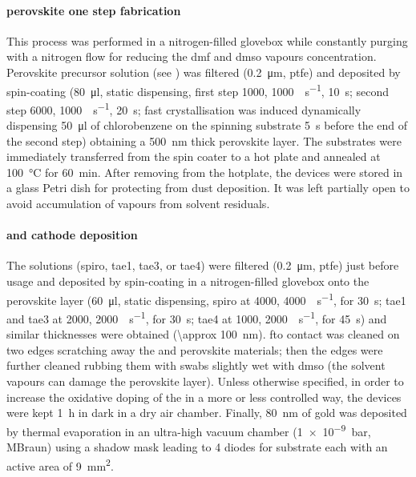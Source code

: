 
		\paragraph{ perovskite one step fabrication}

		This process was performed in a nitrogen-filled glovebox
		while constantly purging with a nitrogen flow for reducing the \gls{dmf} and \gls{dmso} vapours concentration.
		Perovskite precursor solution (see ) was filtered (\SI{0.2}{\um}, \gls{ptfe})
		and deposited by spin-coating (\SI{80}{\ul}, static dispensing, first step \SI{1000}{\rpm}, \SI{1000}{\rpm\per\s}, \SI{10}{\s};
		second step \SI{6000}{\rpm}, \SI{1000}{\rpm\per\s}, \SI{20}{\s}; fast crystallisation was induced dynamically
		dispensing \SI{50}{\ul} of chlorobenzene on the spinning substrate \SI{5}{\s} before the end of the second
		step) obtaining a \SI{500}{\nm} thick perovskite layer.
		The substrates were immediately transferred from
		the spin coater to a hot plate and annealed at \SI{100}{\celsius} for \SI{60}{\minute}.
		After removing from the hotplate, the devices were stored in a glass Petri dish for protecting from dust deposition.
		It was left partially open to avoid accumulation of vapours from solvent residuals.

		\paragraph{ and cathode deposition}
		The  solutions (\gls{spiro}, \gls{tae1}, \gls{tae3}, or \gls{tae4}) were filtered (\SI{0.2}{\um}, \gls{ptfe}) just before usage and deposited by spin-coating in a nitrogen-filled glovebox
		onto the perovskite layer (\SI{60}{\ul}, static dispensing, \gls{spiro} at \SI{4000}{\rpm}, \SI{4000}{\rpm\per\s},
		for \SI{30}{\s}; \gls{tae1} and \gls{tae3} at \SI{2000}{\rpm}, \SI{2000}{\rpm\per\s}, for \SI{30}{\s}; \gls{tae4} at \SI{1000}{\rpm}, \SI{2000}{\rpm\per\s},
		for \SI{45}{\s}) and similar  thicknesses were obtained (\SI{\approx 100}{\nm}).
		\Gls{fto} contact was cleaned on two edges scratching away the  and perovskite materials; then the edges were further cleaned rubbing them with swabs slightly wet with \gls{dmso} (the solvent vapours can damage the perovskite layer).
		Unless otherwise specified, in order to increase the
		oxidative doping of the  in a more or less controlled way, the devices were kept \SI{1}{\hour} in dark in a dry air chamber.
		Finally, \SI{80}{\nm} of gold was deposited by thermal evaporation in an ultra-high vacuum chamber
		(\SI{1e-9}{\bar}, MBraun) using a shadow mask leading to 4 diodes for substrate each with an active area of
		\SI{9}{\mm\squared}.
		\label{methods_bottom_end}


